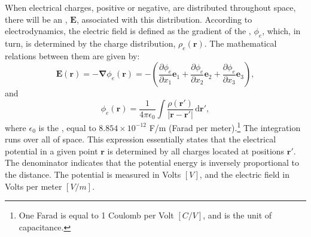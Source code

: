 When electrical charges, positive or negative, are distributed throughout space, there will be an , $\mathbf{E}$, associated with this distribution.   According to electrodynamics, the electric field is defined as the gradient of the , $\phi_e$, which, in turn, is determined by the charge distribution, $\rho_e(\mathbf{r})$.  The mathematical relations between them are given by:
\begin{equation}
	\mathbf{E}(\mathbf{r}) = -\bm{\nabla} \phi_e(\mathbf{r}) = -(\frac{\partial \phi_e}{\partial x_1}\mathbf{e}_1+
		\frac{\partial \phi_e}{\partial x_2}\mathbf{e}_2+
		\frac{\partial \phi_e}{\partial x_3}\mathbf{e}_3),
\end{equation}
and 
\begin{equation}
	\phi_e(\mathbf{r}) = \frac{1}{4\pi\epsilon_0} \int \frac{\rho(\mathbf{r}')}{\vert\mathbf{r}-\mathbf{r}'\vert}\,\mathrm{d}\mathbf{r}',
\end{equation}
where $\epsilon_0$ is the , equal to  $8.854\times 10^{-12}$ F/m (Farad per meter).\footnote{One Farad is equal  to 1 Coulomb per Volt $[C/V]$, and is the unit of capacitance.}  The integration runs over all of space. This expression essentially states that the electrical potential in a given point $\mathbf{r}$ is determined by all charges located at positions $\mathbf{r}'$.  The denominator indicates that the potential energy is inversely proportional to the distance.  The potential is measured in Volts $[V]$, and the electric field in Volts per meter $[V/m]$.


